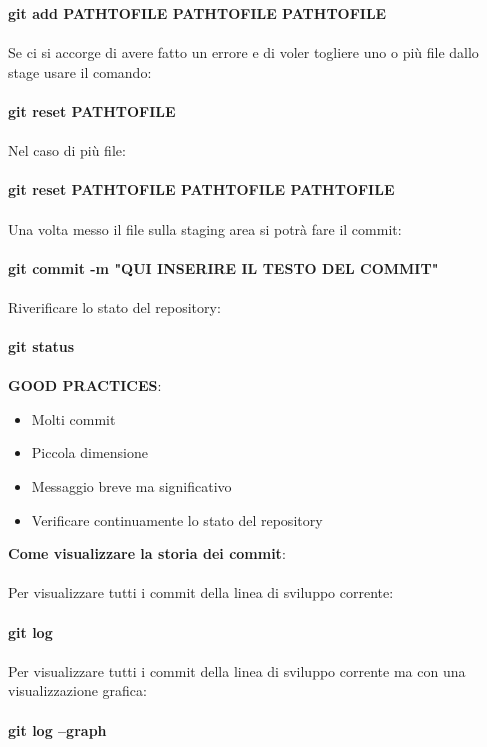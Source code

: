 \documentclass[a4paper,12pt]{report}
\begin{document}
\textbf{git add PATH\textunderscore TO\textunderscore FILE PATH\textunderscore TO\textunderscore FILE PATH\textunderscore TO\textunderscore FILE}
\\\\
Se ci si accorge di avere fatto un errore e di voler togliere uno o più file dallo stage usare il comando:
\\\\
\textbf{git reset PATH\textunderscore TO\textunderscore FILE}
\\\\
Nel caso di più file:
\\\\
\textbf{git reset PATH\textunderscore TO\textunderscore FILE PATH\textunderscore TO\textunderscore FILE PATH\textunderscore TO\textunderscore FILE}
\\\\
Una volta messo il file sulla staging area si potrà fare il commit:
\\\\
\textbf{git commit -m "QUI INSERIRE IL TESTO DEL COMMIT"}
\\\\
Riverificare lo stato del repository:
\\\\
\textbf{git status}
\\\\
\textbf{GOOD PRACTICES}:
\begin{itemize}
\item Molti commit
\item Piccola dimensione
\item Messaggio breve ma significativo
\item Verificare continuamente lo stato del repository
\end{itemize}
\textbf{Come visualizzare la storia dei commit}:
\\\\
Per visualizzare tutti i commit della linea di sviluppo corrente:
\\\\
\textbf{git log}
\\\\
Per visualizzare tutti i commit della linea di sviluppo corrente ma con una visualizzazione grafica:
\\\\
\textbf{git log --graph}
\end{document}

